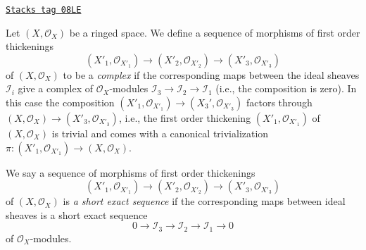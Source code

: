 \begin{remark}
\label{defos-remark-short-exact-sequence-thickenings}
\href{https://stacks.math.columbia.edu/tag/08LE}{\texttt{Stacks tag 08LE}}

Let $(X, \mathcal{O}_X)$ be a ringed space. We define a sequence of morphisms
of first order thickenings
$$
(X'_1, \mathcal{O}_{X'_1}) \to
(X'_2, \mathcal{O}_{X'_2}) \to
(X'_3, \mathcal{O}_{X'_3})
$$
of $(X, \mathcal{O}_X)$ to be a {\it complex}
if the corresponding maps between
the ideal sheaves $\mathcal{I}_i$
give a complex of $\mathcal{O}_X$-modules
$\mathcal{I}_3 \to \mathcal{I}_2 \to \mathcal{I}_1$
(i.e., the composition is zero). In this case the composition
$(X'_1, \mathcal{O}_{X'_1}) \to (X_3', \mathcal{O}_{X'_3})$ factors through
$(X, \mathcal{O}_X) \to (X'_3, \mathcal{O}_{X'_3})$, i.e.,
the first order thickening $(X'_1, \mathcal{O}_{X'_1})$ of
$(X, \mathcal{O}_X)$ is trivial and comes with
a canonical trivialization
$\pi : (X'_1, \mathcal{O}_{X'_1}) \to (X, \mathcal{O}_X)$.

\medskip\noindent
We say a sequence of morphisms of first order thickenings
$$
(X'_1, \mathcal{O}_{X'_1}) \to
(X'_2, \mathcal{O}_{X'_2}) \to
(X'_3, \mathcal{O}_{X'_3})
$$
of $(X, \mathcal{O}_X)$ is {\it a short exact sequence} if the
corresponding maps between ideal sheaves is a short exact sequence
$$
0 \to \mathcal{I}_3 \to \mathcal{I}_2 \to \mathcal{I}_1 \to 0
$$
of $\mathcal{O}_X$-modules.
\end{remark}

